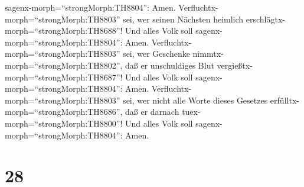 sagenx-morph=``strongMorph:TH8804'': Amen. 
Verfluchtx-morph=``strongMorph:TH8803'' sei, wer seinen Nächsten
heimlich erschlägtx-morph=``strongMorph:TH8688''! Und alles Volk soll
sagenx-morph=``strongMorph:TH8804'': Amen. 
Verfluchtx-morph=``strongMorph:TH8803'' sei, wer Geschenke
nimmtx-morph=``strongMorph:TH8802'', daß er unschuldiges Blut
vergießtx-morph=``strongMorph:TH8687''! Und alles Volk soll
sagenx-morph=``strongMorph:TH8804'': Amen. 
Verfluchtx-morph=``strongMorph:TH8803'' sei, wer nicht alle Worte dieses
Gesetzes erfülltx-morph=``strongMorph:TH8686'', daß er darnach
tuex-morph=``strongMorph:TH8800''! Und alles Volk soll
sagenx-morph=``strongMorph:TH8804'': Amen.

\hypertarget{section-27}{%
\section{28}\label{section-27}}

